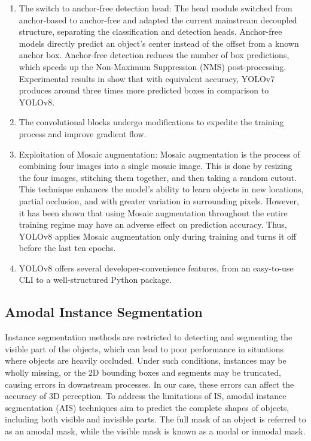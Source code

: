 \begin{enumerate}
	\item The switch to anchor-free detection head: The head module switched from anchor-based to anchor-free and adapted the current mainstream decoupled structure, separating the classification and detection heads. Anchor-free models directly predict an object's center instead of the offset from a known anchor box. Anchor-free detection reduces the number of box predictions, which speeds up the Non-Maximum Suppression (NMS) post-processing. Experimental results in \cite{detrs} show that with equivalent accuracy, YOLOv7 produces around three times more predicted boxes in comparison to YOLOv8. 
	\item The convolutional blocks undergo modifications to expedite the training process and improve gradient flow.
	\item Exploitation of Mosaic augmentation: Mosaic augmentation is the process of combining four images into a single mosaic image. This is done by resizing the four images, stitching them together, and then taking a random cutout. This technique enhances the model's ability to learn objects in new locations, partial occlusion, and with greater variation in surrounding pixels. However, it has been shown that using Mosaic augmentation throughout the entire training regime may have an adverse effect on prediction accuracy. Thus, YOLOv8 applies Mosaic augmentation only during training and turns it off before the last ten epochs. 
	\item YOLOv8 offers several developer-convenience features, from an easy-to-use CLI to a well-structured Python package.
\end{enumerate}

\subsection{Amodal Instance Segmentation}

Instance segmentation methods are restricted to detecting and segmenting the visible part of the objects, which can lead to poor performance in situations where objects are heavily occluded. Under such conditions, instances may be wholly missing, or the 2D bounding boxes and segments may be truncated, causing errors in downstream processes. In our case, these errors can affect the accuracy of 3D perception. To address the limitations of IS, amodal instance segmentation (AIS) techniques aim to predict the complete shapes of objects, including both visible and invisible parts. The full mask of an object is referred to as an amodal mask, while the visible mask is known as a modal or inmodal mask.


